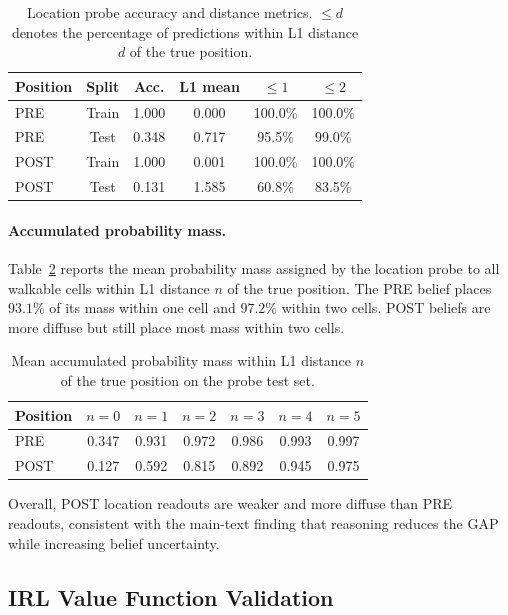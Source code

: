 \documentclass[10pt,twocolumn]{article}
\begin{document}
\begin{table}[!ht]
\centering
\small
\begin{tabular}{lccccc}
\toprule
\textbf{Position} & \textbf{Split} & \textbf{Acc.} & \textbf{L1 mean}  & $\leq 1$ & $\leq 2$ \\
\midrule
PRE  & Train & 1.000 & 0.000 & 100.0\% & 100.0\% \\
PRE  & Test  & 0.348 & 0.717 &  95.5\% &  99.0\% \\
POST & Train & 1.000 & 0.001 & 100.0\% & 100.0\% \\
POST & Test  & 0.131 & 1.585 &  60.8\% &  83.5\% \\
\bottomrule
\end{tabular}
\caption{Location probe accuracy and distance metrics. $\leq d$ denotes the
percentage of predictions within L1 distance $d$ of the true position.}
\label{tab:loc_probe_acc_app}
\end{table}

\paragraph{Accumulated probability mass.}
Table~\ref{tab:vicinity_prob_app} reports the mean probability mass assigned by
the location probe to all walkable cells within L1 distance $n$ of the true
position. The PRE belief places $93.1\%$ of its mass within one cell and
$97.2\%$ within two cells. POST beliefs are more diffuse but still place most
mass within two cells.

\begin{table}[!ht]
\centering
\small
\begin{tabular}{lcccccc}
\toprule
\textbf{Position} & $n=0$ & $n=1$ & $n=2$ & $n=3$ & $n=4$ & $n=5$ \\
\midrule
PRE  & 0.347 & 0.931 & 0.972 & 0.986 & 0.993 & 0.997 \\
POST & 0.127 & 0.592 & 0.815 & 0.892 & 0.945 & 0.975 \\
\bottomrule
\end{tabular}
\caption{Mean accumulated probability mass within L1 distance $n$ of the true
position on the probe test set.}
\label{tab:vicinity_prob_app}
\end{table}

Overall, POST location readouts are weaker and more diffuse than PRE readouts,
consistent with the main-text finding that reasoning reduces the GAP while
increasing belief uncertainty.

\subsection{IRL Value Function Validation}
\label{app:irl_validation}
\end{document}
